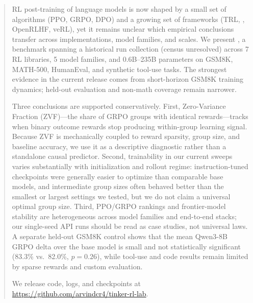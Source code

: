 \begin{abstract}
RL post-training of language models is now shaped by a small set of
algorithms (PPO, GRPO, DPO) and a growing set of frameworks (TRL,
\tinker{}, OpenRLHF, veRL), yet it remains unclear which empirical conclusions
transfer across implementations, model families, and scales. We present
\ours{}, a benchmark spanning a historical run collection (census unresolved) across 7 RL libraries, 5 model
families, and 0.6B--235B parameters on GSM8K, MATH-500, HumanEval, and
synthetic tool-use tasks. The strongest evidence in the current release comes
from short-horizon GSM8K training dynamics; held-out evaluation and non-math
coverage remain narrower.

Three conclusions are supported conservatively. First, Zero-Variance Fraction
(ZVF)---the share of GRPO groups with identical rewards---tracks when binary
outcome rewards stop producing within-group learning signal. Because ZVF is
mechanically coupled to reward sparsity, group size, and baseline accuracy, we
use it as a descriptive diagnostic rather than a standalone causal predictor.
Second, trainability in our current sweeps varies substantially with
initialization and rollout regime: instruction-tuned checkpoints were
generally easier to optimize than comparable base models, and intermediate
group sizes often behaved better than the smallest or largest settings we
tested, but we do not claim a universal optimal group size. Third, PPO/GRPO
rankings and frontier-model stability are heterogeneous across model families
and end-to-end stacks; our single-seed API runs should be read as case studies,
not universal laws. A separate held-out GSM8K control shows that the mean
Qwen3-8B GRPO delta over the base model is small and not statistically
significant (83.3\% vs.\ 82.0\%, $p{=}0.26$), while tool-use and code results
remain limited by sparse rewards and custom evaluation.

We release code, logs, and checkpoints at
\url{https://github.com/arvindcr4/tinker-rl-lab}.
\end{abstract}
